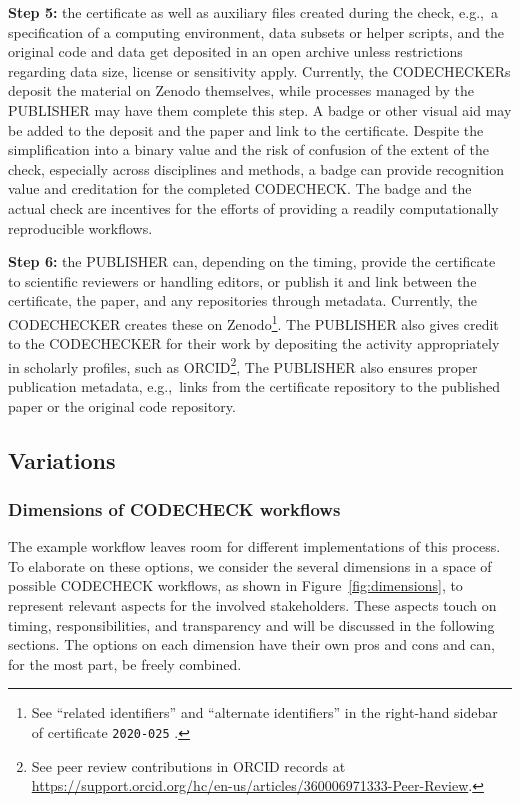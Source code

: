 \documentclass[12pt]{article}
\begin{document}
\textbf{Step 5:} the certificate as well as auxiliary files created
during the check, e.g.,~a specification of a computing environment, data 
subsets or helper scripts, and the original code and data get deposited in
an open archive unless restrictions regarding data size, license or 
sensitivity apply.
Currently, the CODECHECKERs deposit the material on Zenodo themselves, 
while processes managed by the PUBLISHER may have them complete this step.
A badge or other visual aid may be added to the deposit and the paper and
link to the certificate.
Despite the simplification into a binary value and the risk of confusion of
the extent of the check, especially across disciplines and methods,
a badge can provide recognition value and creditation for the completed
CODECHECK. The badge and the actual check are incentives for the efforts
of providing a readily computationally reproducible workflows.

\textbf{Step 6:} the PUBLISHER can, depending on the timing, provide the
certificate to scientific reviewers or handling editors, or publish it
and link between the certificate, the paper, and any repositories 
through metadata. Currently, the CODECHECKER creates these on Zenodo\footnote{
See ``related identifiers'' and ``alternate identifiers'' in the right-hand
sidebar of certificate \texttt{2020-025} \cite{cert-2020-025}.}.
The PUBLISHER also gives credit to the CODECHECKER for their work by depositing
the activity appropriately in scholarly profiles, such as ORCID\footnote{
See peer review contributions in ORCID records at
\url{https://support.orcid.org/hc/en-us/articles/360006971333-Peer-Review}.},
The PUBLISHER also ensures proper publication metadata, e.g.,~links from the 
certificate repository to the published paper or the original code repository.

\subsection*{Variations}\label{variations}

\subsubsection*{Dimensions of CODECHECK workflows}\label{dimensions-of-workflows}

The example workflow leaves room for different
implementations of this process. To elaborate on these options, we consider
the several dimensions in a space of possible CODECHECK workflows, as shown in 
Figure~\ref{fig:dimensions}, to represent relevant aspects for the involved
stakeholders. These aspects touch on timing, responsibilities, and 
transparency and will be discussed in the following sections.
The options on each dimension have their own pros and cons and can,
for the most part, be freely combined.
\end{document}
